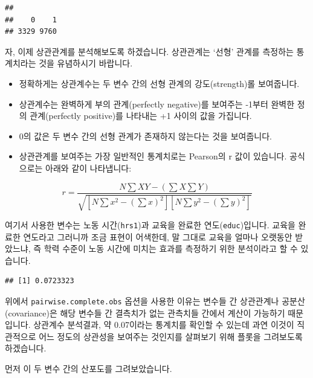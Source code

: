 \documentclass[]{book}
\newenvironment{Shaded}{\begin{snugshade}}{\end{snugshade}}
\newcommand{\DataTypeTok}[1]{\textcolor[rgb]{0.13,0.29,0.53}{#1}}
\newcommand{\KeywordTok}[1]{\textcolor[rgb]{0.13,0.29,0.53}{\textbf{#1}}}
\newcommand{\NormalTok}[1]{#1}
\newcommand{\OperatorTok}[1]{\textcolor[rgb]{0.81,0.36,0.00}{\textbf{#1}}}
\newcommand{\StringTok}[1]{\textcolor[rgb]{0.31,0.60,0.02}{#1}}
\begin{document}
\begin{verbatim}
## 
##    0    1 
## 3329 9760
\end{verbatim}

자, 이제 상관관계를 분석해보도록 하겠습니다. 상관관계는 `선형' 관계를 측정하는 통계치라는 것을 유념하시기 바랍니다.

\begin{itemize}
\item
  정확하게는 상관계수는 두 변수 간의 선형 관계의 강도(strength)롤 보여줍니다.
\item
  상관계수는 완벽하게 부의 관계(perfectly negative)를 보여주는 -1부터 완벽한 정의 관계(perfectly positive)를 나타내는 +1 사이의 값을 가집니다.
\item
  0의 값은 두 변수 간의 선형 관계가 존재하지 않는다는 것을 보여줍니다.
\item
  상관관계를 보여주는 가장 일반적인 통계치로는 Pearson의 r 값이 있습니다. 공식으로는 아래와 같이 나타냅니다:
\end{itemize}

\[ r = \frac{N \sum XY - (\sum X \sum Y)}{\sqrt{[N\sum x^2 - (\sum x)^2][N\sum y^2 - (\sum y)^2]}}\]

여기서 사용한 변수는 노동 시간(\texttt{hrs1})과 교육을 완료한 연도(\texttt{educ})입니다. 교육을 완료한 연도라고 그러니까 조금 표현이 어색한데, 말 그대로 교육을 얼마나 오랫동안 받았느냐, 즉 학력 수준이 노동 시간에 미치는 효과를 측정하기 위한 분석이라고 할 수 있습니다.

\begin{Shaded}
\end{Shaded}

\begin{verbatim}
## [1] 0.0723323
\end{verbatim}

위에서 \texttt{pairwise.complete.obs} 옵션을 사용한 이유는 변수들 간 상관관계나 공분산(covariance)은 해당 변수들 간 결측치가 없는 관측치들 간에서 계산이 가능하기 때문입니다. 상관계수 분석결과, 약 0.07이라는 통계치를 확인할 수 있는데 과연 이것이 직관적으로 어느 정도의 상관성을 보여주는 것인지를 살펴보기 위해 플롯을 그려보도록 하겠습니다.

먼저 이 두 변수 간의 산포도를 그려보았습니다.
\end{document}
